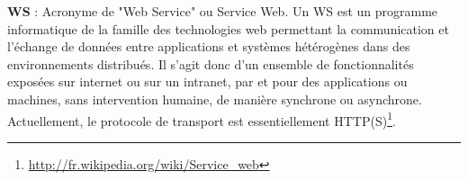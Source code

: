\textbf{WS} : Acronyme de "Web Service" ou Service Web. Un WS est un programme informatique de la famille des technologies web permettant la communication et l'échange de données entre applications et systèmes hétérogènes dans des environnements distribués. Il s'agit donc d'un ensemble de fonctionnalités exposées sur internet ou sur un intranet, par et pour des applications ou machines, sans intervention humaine, de manière synchrone ou asynchrone. Actuellement, le protocole de transport est essentiellement HTTP(S)\footnote{\url{http://fr.wikipedia.org/wiki/Service_web}}. \\

